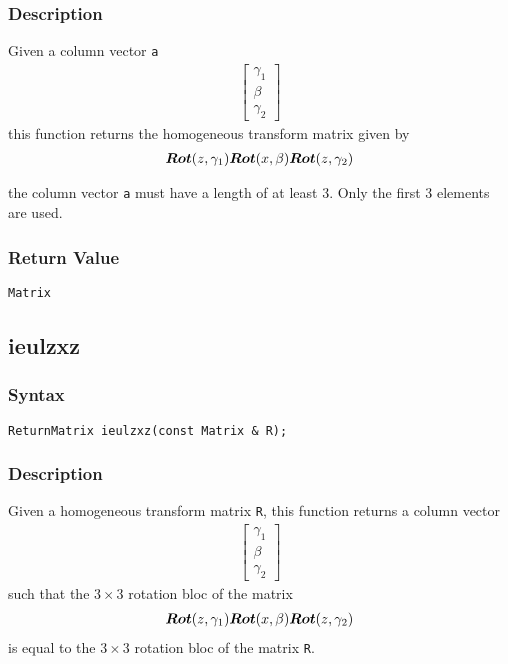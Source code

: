 \documentclass[dvips,11pt,fleqn]{report}
\newcommand{\mbold}[1]{\mbox{\boldmath $ #1 $}}
\newcommand{\matr}[2]{\left[\begin{array}{#1} #2 \end{array}\right]}
\begin{document}
\subsubsection*{Description}
Given a column vector {\tt a} 
\begin{eqnarray}
\matr{c}{\gamma_1 \\ \beta \\ \gamma_2}
\end{eqnarray}
this function returns the homogeneous transform matrix given by 
\begin{eqnarray}
\mbold{Rot}(z,\gamma_1) \mbold{Rot}(x,\beta) \mbold{Rot}(z,\gamma_2)
\end{eqnarray}

 the column vector {\tt a} must have a length of at least 3. 
Only the first 3 elements are used.

\subsubsection*{Return Value}

{\tt Matrix}

\newpage

\subsection*{ieulzxz}
\subsubsection*{Syntax}
\begin{verbatim}
ReturnMatrix ieulzxz(const Matrix & R);
\end{verbatim}
\subsubsection*{Description}
Given a homogeneous transform matrix {\tt R}, this function returns a column vector
\begin{eqnarray}
\matr{c}{\gamma_1 \\ \beta \\ \gamma_2}
\end{eqnarray}
such that the $3 \times 3$ rotation bloc of the matrix
\begin{eqnarray}
\mbold{Rot}(z,\gamma_1) \mbold{Rot}(x,\beta) \mbold{Rot}(z,\gamma_2)
\end{eqnarray}
is equal to the $3 \times 3$ rotation bloc of the matrix {\tt R}.
\end{document}
